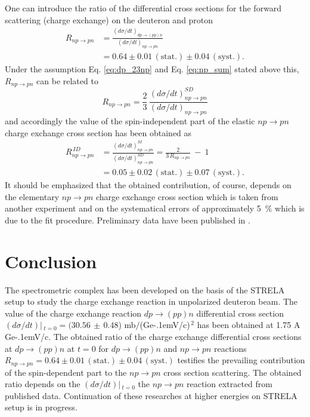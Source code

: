 \documentclass[twocolumn,epjc3]{svjour3}
\newcommand{\np}     {\ensuremath{np \rightarrow pn}\xspace}
\newcommand{\dpchex} {\ensuremath{dp \rightarrow (pp)n}\xspace}
\newcommand{\GeVc}   {Ge\kern-.1emV/c\xspace}
\begin{document}
One can introduce the ratio of the differential cross sections for the forward
scattering (charge exchange) on the deuteron and proton
\begin{equation}
  \begin{split}
    R_{\np} &= \frac{(d\sigma/dt)_{\dpchex}}{(d\sigma/dt)_{\np}} \\
    &= 0.64 \pm 0.01\,\mathrm{(stat.)} \pm 0.04\,\mathrm{(syst.)}.
  \end{split}
\end{equation}
Under the assumption Eq. \eqref{eq:dp_23np} and Eq. \eqref{eq:np_sum} stated
above this, $R_{\np}$ can be related to
\begin{equation}
  R_{\np} = \frac{2}{3}\,\frac{(d\sigma/dt)^{SD}_{\np}}{(d\sigma/dt)_{\np}}
\end{equation}
and accordingly the value of the spin-independent part of the elastic \np charge
exchange cross section has been obtained as
\begin{equation}
  \begin{split}
    R^{\,ID}_{\np} &= \frac{(d\sigma/dt)^{SI}_{\np}}{(d\sigma/dt)^{SD}_{\np}}
    = \frac{2}{3\,R_{\np}} \ - \ 1 \\
    &= 0.05 \pm 0.02\,\mathrm{(stat.)} \pm 0.07\,\mathrm{(syst.)}.
  \end{split}
\end{equation}
It should be emphasized that the obtained contribution, of course, depends on
the elementary \np charge exchange cross section which is taken from another
experiment and on the systematical errors of approximately 5~\% which is due to
the fit procedure. Preliminary data have been published in \cite{bas14,bas16}.

\section{Conclusion}
The spectrometric complex has been developed on the basis of the STRELA setup to
study the charge exchange reaction in unpolarized deuteron beam. The value of
the charge exchange reaction \dpchex differential cross section
$(d\sigma/dt)|\,_{t=0}=(30.56\,\pm\,0.48$) mb$/$(\GeVc)$^{\,2}$ has been
obtained at 1.75 A \GeVc. The obtained ratio of the charge exchange differential
cross sections at \dpchex at $t=0$ for \dpchex and \np reactions
$R_{\np} = 0.64 \pm 0.01\,\mathrm{(stat.)} \pm 0.04\,\mathrm{(syst.)}$ testifies
the prevailing contribution of the spin-dependent part to the \np cross section
scattering. The obtained ratio depends on the $(d\sigma/dt)|\,_{t=0}$ the \np
reaction extracted from published data. Continuation of these researches at
higher energies on STRELA setup is in progress.
\end{document}
